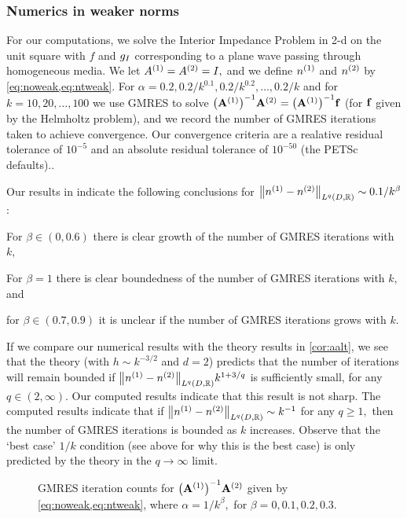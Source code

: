 \subsubsection{Numerics in weaker norms}\label{sec:weakernumerics}
For our computations, we solve the Interior Impedance Problem in 2-d on the unit square with $f$ and $g_{I}$ corresponding to a plane wave passing through homogeneous media. We let ${A}^{(1)}={A}^{(2)}=I,$ and we define ${n}^{(1)}$ and ${n}^{(2)}$ by \cref{eq:noweak,eq:ntweak}. For $\alpha = 0.2,0.2/k^{0.1},0.2/k^{0.2},\ldots,0.2/k$ and for $k=10,20,\ldots,100$ we use GMRES to solve $\AmatoI\Amatt = \AmatoI \bff$ (for $\mathbf{f}$ given by the Helmholtz problem), and we record the number of GMRES iterations taken to achieve convergence. Our convergence criteria are a realative residual tolerance of $10^{-5}$ and an absolute residual tolerance of $10^{-50}$ (the PETSc defaults)..

Our results in indicate the following conclusions for $\NLqDRR{\nso-\nst} \sim 0.1/k^{\beta}$ :
\bit
\item For $\beta \in (0,0.6)$ there is clear growth of the number of GMRES iterations with $k$,
\item For $\beta = 1$ there is clear boundedness of the number of GMRES iterations with $k$, and
  \item for $\beta \in (0.7,0.9)$ it is unclear if the number of GMRES iterations grows with $k.$
\eit

If we compare our numerical results with the theory results in \cref{cor:aalt}, we see that the theory (with $h \sim k^{-3/2}$ and $d=2$) predicts that the number of iterations will remain bounded if $\NLqDRR{\nso-\nst} k^{1+3/q}$ is sufficiently small, for any $q \in (2,\infty).$ Our computed results indicate that this result is not sharp. The computed results indicate that if $\NLqDRR{\nso-\nst} \sim k^{-1}$ for any $q \geq 1,$ then the number of GMRES iterations is bounded as $k$ increases. Observe that the `best case' $1/k$ condition (see  above for why this is the best case) is only predicted by the theory in the $q\rightarrow \infty$ limit.


\begin{figure}

  \caption{GMRES iteration counts for $\AmatoI\Amatt$ given by \cref{eq:noweak,eq:ntweak}, where $\alpha = 1/k^\beta,$ for $\beta = 0,0.1,0.2,0.3.$}\label{fig:l1low}
\end{figure}

